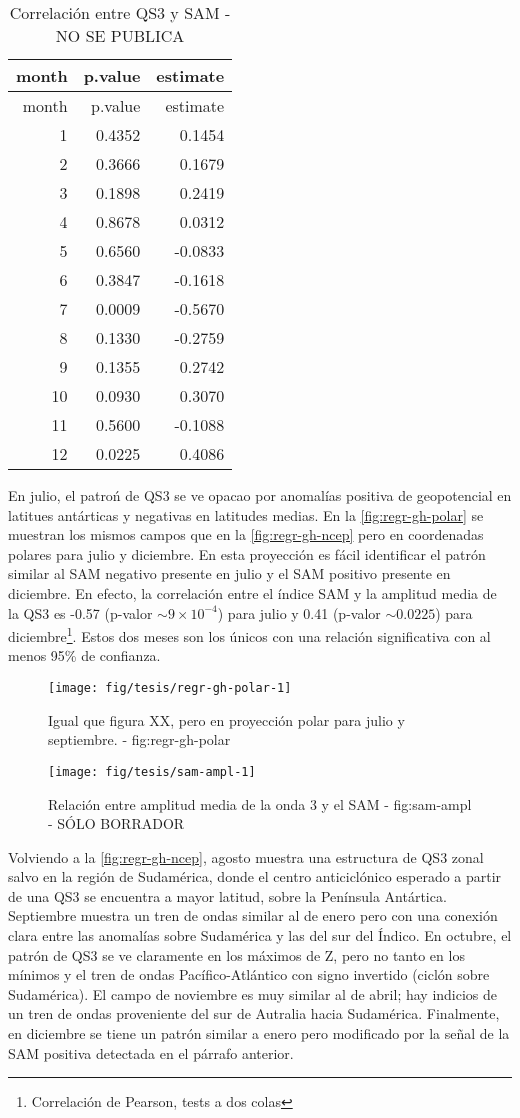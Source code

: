 \documentclass[spanish,a4paper]{book}
\let\rmarkdownfootnote\footnote%
\def\footnote{\protect\rmarkdownfootnote}
\begin{document}
\begin{longtable}[]{@{}rrr@{}}
\caption{Correlación entre QS3 y SAM - NO SE PUBLICA}\tabularnewline
\toprule
month & p.value & estimate\tabularnewline
\midrule
\endfirsthead
\toprule
month & p.value & estimate\tabularnewline
\midrule
\endhead
1 & 0.4352 & 0.1454\tabularnewline
2 & 0.3666 & 0.1679\tabularnewline
3 & 0.1898 & 0.2419\tabularnewline
4 & 0.8678 & 0.0312\tabularnewline
5 & 0.6560 & -0.0833\tabularnewline
6 & 0.3847 & -0.1618\tabularnewline
7 & 0.0009 & -0.5670\tabularnewline
8 & 0.1330 & -0.2759\tabularnewline
9 & 0.1355 & 0.2742\tabularnewline
10 & 0.0930 & 0.3070\tabularnewline
11 & 0.5600 & -0.1088\tabularnewline
12 & 0.0225 & 0.4086\tabularnewline
\bottomrule
\end{longtable}

En julio, el patroń de QS3 se ve opacao por anomalías positiva de
geopotencial en latitues antárticas y negativas en latitudes medias. En
la \autoref{fig:regr-gh-polar} se muestran los mismos campos que en la
\autoref{fig:regr-gh-ncep} pero en coordenadas polares para julio y
diciembre. En esta proyección es fácil identificar el patrón similar al
SAM negativo presente en julio y el SAM positivo
presente en diciembre. En efecto, la correlación entre el índice SAM y
la amplitud media de la QS3 es -0.57 (p-valor \(\sim 9\times 10^{-4}\))
para julio y 0.41 (p-valor \(\sim 0.0225\)) para
diciembre\footnote{Correlación de Pearson, tests a dos colas}. Estos dos
meses son los únicos con una relación significativa con al menos 95\% de
confianza.

\begin{figure*}
\texttt{[image: fig/tesis/regr-gh-polar-1]} \caption{Igual que figura  XX, pero en proyección polar para julio y septiembre. - fig:regr-gh-polar}\label{fig:regr-gh-polar}
\end{figure*}

\begin{figure*}
\texttt{[image: fig/tesis/sam-ampl-1]} \caption{Relación entre amplitud media de la onda 3 y el SAM - fig:sam-ampl - SÓLO BORRADOR}\label{fig:sam-ampl}
\end{figure*}

Volviendo a la \autoref{fig:regr-gh-ncep}, agosto muestra una estructura
de QS3 zonal salvo en la región de Sudamérica, donde el centro
anticiclónico esperado a partir de una QS3 se encuentra a mayor latitud,
sobre la Península Antártica. Septiembre muestra un tren de ondas
similar al de enero pero con una conexión clara entre las anomalías
sobre Sudamérica y las del sur del Índico. En
octubre, el patrón de QS3 se ve claramente en los máximos de Z, pero no
tanto en los mínimos y el tren de ondas Pacífico-Atlántico con signo
invertido (ciclón sobre Sudamérica). El campo de noviembre es muy
similar al de abril; hay indicios de un tren de ondas proveniente del
sur de Autralia hacia Sudamérica. Finalmente, en diciembre se tiene un
patrón similar a enero pero modificado por la señal de la SAM positiva
detectada en el párrafo anterior.
\end{document}
